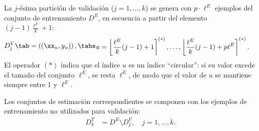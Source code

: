 La $j$-ésima partición de validación ($j=1,\ldots,k$) se genera con
$p\cdot\ell^E$ ejemplos del conjunto de entrenamiento $D^E$, en
secuencia a partir del elemento $(j-1)\frac{\ell^E}{k}+1$:
%
\begin{align}
  D^V_j \tab= \left((\xx_u,y_u)\right), \tabs
  \begin{split}
    u &= \left\lfloor\frac{\ell^E}{k}(j-1)+1\right\rceil^{(*)},\ldots,
    \left\lfloor\frac{\ell^E}{k}(j-1)+p\ell^E\right\rceil^{(*)}.
  \end{split}
\end{align}
%
El operador $(*)$ indica que el índice $u$ es un índice ``circular'':
si su valor excede el tamaño del conjunto $\ell^E$, se resta $\ell^E$, de
modo que el valor de $u$ se mantiene siempre entre $1$ y $\ell^E$.

Los conjuntos de estimación correspondientes se componen con los
ejemplos de entrenamiento no utilizados para validación:
%
\begin{align}
  D^T_k &= D^E \setminus D^V_j, \quad j=1,\ldots,k.
\end{align}
%

